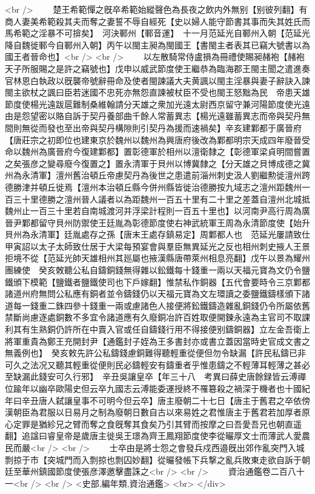 <br />
　　楚王希範憚之旣卒希範始縱聲色為長夜之飲内外無别【别彼列翻】有商人妻美希範殺其夫而奪之妻誓不辱自經死【史以婦人能守節書其事而失其姓氏而馬希範之淫暴不可揜矣】　河決鄆州【鄆音運】　十一月范延光自鄆州入朝【范延光降自魏徙鄆今自鄆州入朝】丙午以閩主昶為閩國王【書閩主者表其已竊大號書以為國王者晉命也】<br />
<br />
　　以左散騎常侍盧損為冊禮使賜昶赭袍【赭袍天子所服賜之是許之竊號也】戊申以威武節度使王繼恭為臨海郡王閩主聞之遣進奏官林恩白執政以旣襲帝號辭冊命及使者閩諫議大夫黄諷以閩主淫暴與妻子辭訣入諫閩主欲杖之諷曰臣若迷國不忠死亦無怨直諫被杖臣不受也閩王怒黜為民　帝患天雄節度使楊光遠跋扈難制桑維翰請分天雄之衆加光遠太尉西京留守兼河陽節度使光遠由是怨望密以賂自訴于契丹養部曲千餘人常蓄異志【楊光遠雖蓄異志而帝與契丹無間則無從而發也至出帝與契丹構隙則引契丹為援而速禍矣】辛亥建鄴都于廣晉府【唐莊宗之初即位也建東京於魏州以魏州為興唐府後改為鄴都明宗天成四年廢晉受命以魏州為廣晉府今復建鄴都】置彰德軍於相州以澶衛隸之【彰德軍梁貞明間嘗置之矣張彦之變尋廢今復置之】置永清軍于貝州以博冀隸之【分天雄之貝博成德之冀州為永清軍】澶州舊治頓丘帝慮契丹為後世之患遣前淄州刺史汲人劉繼勲徙澶州跨德勝津并頓丘徙焉【澶州本治頓丘縣今併州縣皆徙治德勝按九域志之澶州距魏州一百三十里德勝之澶州晉人議者以為距魏州一百五十里有二十里之差蓋自澶州北城抵魏州止一百三十里若自南城渡河并浮梁計程則一百五十里也】以河南尹高行周為廣晉尹鄴都留守貝州防禦使王廷胤為彰德節度使右神武統軍王周為永清節度使【始升貝州為永清軍】廷胤處存之孫【唐末王處存鎮易定】周鄴都人也　范延光屢請致仕甲寅詔以太子太師致仕居于大梁每預宴會與羣臣無異延光之反也相州刺史掖人王景拒境不從【范延光帥天雄相州其廵屬也掖漢縣唐帶萊州相息亮翻】戊午以景為耀州團練使　癸亥敇聽公私自鑄銅錢無得雜以鈆鐵每十錢重一兩以天福元寶為文仍令鹽鐵頒下模範【鹽鐵者鹽鐵使司也下戶嫁翻】惟禁私作銅器【五代會要時令三京鄴都諸道州府無問公私應有銅者並令鑄錢仍以天福元寶為文左環讀之委鹽鐵鑄樣頒下諸道每一錢重二銖四參十錢重一兩或慮諸色人接便將鈆鐵鑄造雜亂銅錢仍令所屬依舊禁斷尚慮逐處銅數不多宜令諸道應有久廢銅冶許百姓取便開鍊永遠為主官司不取課利其有生熟銅仍許所在中賣入官或任自鑄錢行用不得接便别鑄銅器】立左金吾衛上將軍重貴為鄭王充開封尹【通鑑封子姪為王多書封亦或書立蓋因當時史官成文書之無義例也】　癸亥敕先許公私鑄錢慮銅難得聽輕重從便但勿令缺漏【許民私鑄已非可久之法况又聽其輕重從便則民必鑄輕安有鑄重者乎惟患鑄之不輕薄耳輕薄之甚必至缺漏此錢安可久行邪】　辛丑吳讓皇卒【年三十八　考異曰薛史唐餘録皆云溥禪位踰年以幽卒歐陽史但云卒九國志云溥能委運授終不罹簒殺之禍深于機者也十國紀年曰辛丑唐人弑讓皇事不可明今但云卒】唐主廢朝二十七日【唐主于舊君之卒依傍漢朝臣為君服以日易月之制為廢朝日數自古以來易姓之君惟唐主于舊君若加厚者原心定罪是猶紾兄之臂而奪之食旣奪其食矣乃引其臂而按摩之曰吾愛吾兄也朝直遥翻】追諡曰睿皇帝是歲唐主徙吳王璟為齊王鳳翔節度使李從曮厚文士而薄武人愛農民而嚴<br />
<br />
　　士卒由是將士怨之會發兵戍西邉旣出郊作亂突門入城剽掠于市【突城門而入剽掠也剽囚妙翻】從曮發帳下兵撃之亂兵敗東走欲自訴于朝廷至華州鎮國節度使張彦澤邀擊盡誅之<br />
<br />
　　資治通鑑卷二百八十一<br />
<br />
<史部,編年類,資治通鑑>  <br>
   </div> 

